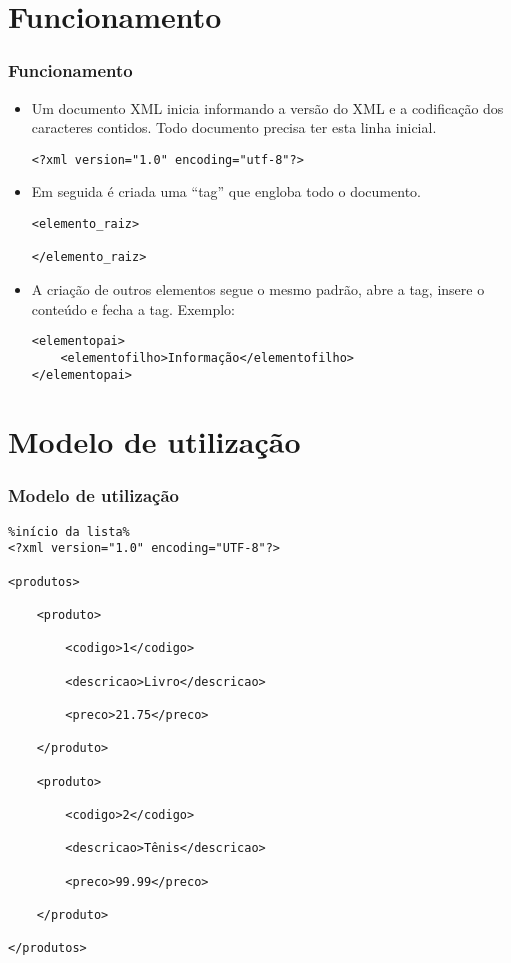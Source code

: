 \documentclass{beamer}
\begin{document}
\section{Funcionamento}
\begin{frame}[fragile]%
\frametitle{\textbf{Funcionamento}\transdissolve}%
\begin{itemize}%
\item<1-> Um documento XML inicia informando a versão do XML e a codificação dos caracteres contidos. Todo documento precisa ter esta linha inicial.
\begin{verbatim}
<?xml version="1.0" encoding="utf-8"?>
\end{verbatim}
\item<2-> Em seguida é criada uma “tag” que engloba todo o documento.
\begin{verbatim}
<elemento_raiz> 

</elemento_raiz>	
\end{verbatim}
\item<3-> A criação de outros elementos segue o mesmo padrão, abre a tag, insere o conteúdo e fecha a tag. Exemplo:
\begin{verbatim}
<elementopai>
  	<elementofilho>Informação</elementofilho>
</elementopai>
\end{verbatim}
\end{itemize}
\end{frame}

\section{Modelo de utilização}
\begin{frame}%
\frametitle{\textbf{Modelo de utilização}\transdissolve}%
\begin{verbatim}%início da lista%
<?xml version="1.0" encoding="UTF-8"?>

<produtos>

    <produto>

        <codigo>1</codigo>

        <descricao>Livro</descricao>

        <preco>21.75</preco>

    </produto>

    <produto>

        <codigo>2</codigo>

        <descricao>Tênis</descricao>

        <preco>99.99</preco>
        
    </produto>

</produtos>
\end{verbatim}
\end{frame}
\end{document}

